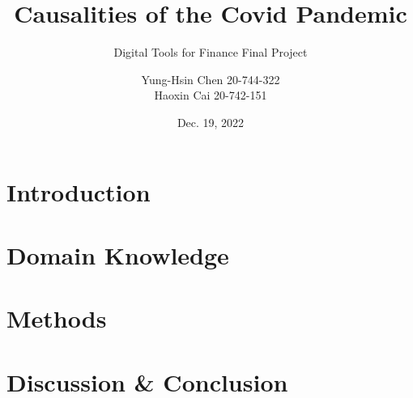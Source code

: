 \documentclass{beamer}
\title[Causalities of the Covid Pandemic]{Causalities of the Covid Pandemic}
\subtitle{Digital Tools for Finance Final Project}
\author[Y. Chen, H. Cai]{Yung-Hsin Chen 20-744-322
\\ Haoxin Cai 20-742-151}
\institute[IfI, UZH]{Department of Informatics\\University of Zurich}
\date{Dec. 19, 2022}
\begin{document}
\begin{frame}
\titlepage
\end{frame}


\section{Introduction}


\section{Domain Knowledge}


\section{Methods}


\section{Discussion \& Conclusion}



%     
%     
\end{document}
